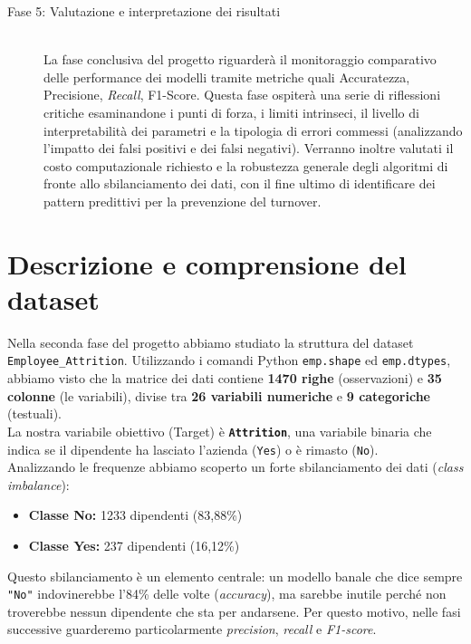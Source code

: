 \documentclass{article}
\begin{document}
\begin{description}
 \item[Fase 5: Valutazione e interpretazione dei risultati]\mbox{}\\La fase conclusiva del progetto riguarderà il monitoraggio comparativo delle performance dei modelli tramite metriche quali Accuratezza, Precisione, \textit{Recall}, F1-Score. Questa fase ospiterà una serie di riflessioni critiche esaminandone i punti di forza, i limiti intrinseci, il livello di interpretabilità dei parametri e la tipologia di errori commessi (analizzando l'impatto dei falsi positivi e dei falsi negativi). Verranno inoltre valutati il costo computazionale richiesto e la robustezza generale degli algoritmi di fronte allo sbilanciamento dei dati, con il fine ultimo di identificare dei pattern predittivi per la prevenzione del turnover.
\end{description}

\newpage
\section{Descrizione e comprensione del dataset}
Nella seconda fase del progetto abbiamo studiato la struttura del dataset \texttt{Employee\_Attrition}. Utilizzando i comandi Python \texttt{emp.shape} ed \texttt{emp.dtypes}, abbiamo visto che la matrice dei dati contiene \textbf{1470 righe} (osservazioni) e \textbf{35 colonne} (le variabili), divise tra \textbf{26 variabili numeriche} e \textbf{9 categoriche} (testuali). \\
La nostra variabile obiettivo (Target) è \textbf{\texttt{Attrition}}, una variabile binaria che indica se il dipendente ha lasciato l'azienda (\texttt{Yes}) o è rimasto (\texttt{No}). \\
Analizzando le frequenze abbiamo scoperto un forte sbilanciamento dei dati (\textit{class imbalance}):
\begin{itemize}
    \item \textbf{Classe No:} 1233 dipendenti (83,88\%)
    \item \textbf{Classe Yes:} 237 dipendenti (16,12\%)
\end{itemize}

\noindent Questo sbilanciamento è un elemento centrale: un modello banale che dice sempre \texttt{"No"} indovinerebbe l'84\% delle volte (\textit{accuracy}), ma sarebbe inutile perché non troverebbe nessun dipendente che sta per andarsene. Per questo motivo, nelle fasi successive guarderemo particolarmente \textit{precision}, \textit{recall} e \textit{F1-score}.\\
\end{document}
